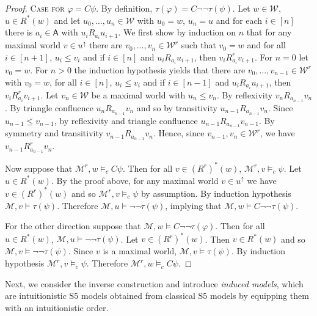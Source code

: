 \documentclass{myifcolog}
\newcommand\C {C}
\newcommand\A{\mathsf{A}}
\newcommand{\agi}{a}
\newcommand{\fw}{\mathcal{M}}
\newcommand{\W}{\mathcal{W}}
\numberwithin{theorem}{section}
\begin{document}
\begin{proof}
    \noindent \textsc{Case for $\varphi = \C \psi$.}  By definition, $\tau(\varphi) = \C \neg \neg \tau(\psi)$. Let $w \in \W$, $u \in R^*(w)$ and let $u_0, \ldots, u_n \in \W$ with $u_0 = w$, $u_n = u$ and for each $ i \in [n]$ there is $\agi_i \in \A$ with $u_i \mathrel{R_{\agi_i}} u_{i+1}$. We first show by induction on $n$ that for any maximal world $v \in u^\uparrow$ there are $v_0, \ldots, v_n \in \W^r$ such that $v_0 = w$ and for all $i \in [n+1]$, $u_i \leq v_i$ and if $i \in [n]$ and $u_i \mathrel{R_{\agi_i}} u_{i+1}$, then $v_i \mathrel{R_{\agi_i}^r} v_{i+1}$. For $n=0$ let $v_0 = w$. For $n>0$ the induction hypothesis yields that there are $v_0, \ldots, v_{n-1} \in \W^r$ with $v_0 = w$, for all $ i \in [n]$, $u_i \leq v_i$ and if $i \in [n-1]$ and $u_i \mathrel{R_{\agi_i}} u_{i+1}$, then $v_i \mathrel{R_{\agi_i}^r} v_{i+1}$. Let $v_n \in \W$ be a maximal world with $u_n \leq v_n$. By reflexivity $v_n \mathrel{R_{\agi_{n-1}}} v_n$. By triangle confluence $u_n \mathrel{R_{\agi_{n-1}}} v_n$ and so by transitivity $u_{n-1} \mathrel{R_{\agi_{n-1}}} v_n$. Since $u_{n-1} \leq v_{n-1}$, by reflexivity and triangle confluence $u_{n-1} \mathrel{R_{\agi_{n-1}}} v_{n-1}$. By symmetry and transitivity $v_{n-1} \mathrel{R_{\agi_{n-1}}} v_n$. Hence, since $v_{n-1}, v_n \in \W^r$, we have $v_{n-1} \mathrel{R_{\agi_{n-1}}^r} v_n$.

    Now suppose that $\fw^r, w \models_c \C \psi$. Then for all $v \in (R^r)^*(w)$, ${\fw^r,v \models_c \psi}$. Let $u \in R^*(w)$. By the proof above, for any maximal world $v \in u^\uparrow$ we have $v \in (R^r)^*(w)$ and so $\fw^r, v \models_c \psi$ by assumption. By induction hypothesis ${\fw,v \models \tau(\psi)}$. Therefore $\fw,u \models \neg \neg \tau(\psi)$, implying that $\fw,w \models \C \neg \neg \tau(\psi)$. 

    For the other direction suppose that $\fw,w \models \C \neg \neg \tau(\varphi)$. Then for all $u \in R^*(w)$, $\fw,u \models \neg \neg \tau (\psi)$. Let $v \in (R^r)^*(w)$. Then $v \in R^*(w)$ and so $\fw,v \models \neg \neg \tau(\psi)$. Since $v$ is a maximal world, $\fw,v \models \tau(\psi)$. By induction hypothesis $\fw^r, v \models_c \psi$. Therefore $\fw^r, w \models_c \C \psi$.    
\end{proof}

Next, we consider the inverse construction and introduce \emph{induced models}, which are intuitionistic S5  models obtained from classical S5 models by equipping them with an intuitionistic order.
\end{document}
